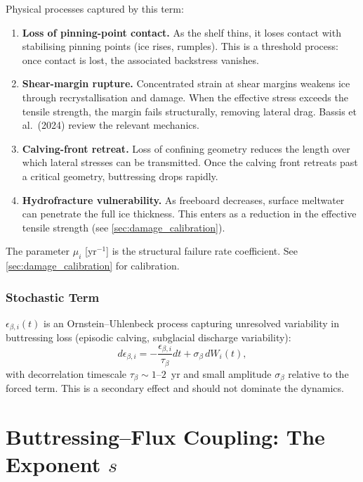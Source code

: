 \documentclass[11pt]{article}
\theoremstyle{definition}
\begin{document}
Physical processes captured by this term:
\begin{enumerate}
  \item \textbf{Loss of pinning-point contact.}  As the shelf thins, it loses contact with stabilising pinning points (ice rises, rumples).  This is a threshold process: once contact is lost, the associated backstress vanishes.
  \item \textbf{Shear-margin rupture.}  Concentrated strain at shear margins weakens ice through recrystallisation and damage.  When the effective stress exceeds the tensile strength, the margin fails structurally, removing lateral drag.  Bassis et al.\ (2024) review the relevant mechanics.
  \item \textbf{Calving-front retreat.}  Loss of confining geometry reduces the length over which lateral stresses can be transmitted.  Once the calving front retreats past a critical geometry, buttressing drops rapidly.
  \item \textbf{Hydrofracture vulnerability.}  As freeboard decreases, surface meltwater can penetrate the full ice thickness.  This enters as a reduction in the effective tensile strength (see \cref{sec:damage_calibration}).
\end{enumerate}

The parameter $\mu_i$ [yr$^{-1}$] is the structural failure rate coefficient.  See \cref{sec:damage_calibration} for calibration.

\subsubsection{Stochastic Term}

$\epsilon_{\beta,i}(t)$ is an Ornstein--Uhlenbeck process capturing unresolved variability in buttressing loss (episodic calving, subglacial discharge variability):
\begin{equation}
  d\epsilon_{\beta,i} = -\frac{\epsilon_{\beta,i}}{\tau_{\beta}} dt + \sigma_{\beta} \, dW_i(t),
\end{equation}
with decorrelation timescale $\tau_\beta \sim 1$--$2$~yr and small amplitude $\sigma_\beta$ relative to the forced term.  This is a secondary effect and should not dominate the dynamics.


\section{Buttressing--Flux Coupling: The Exponent $s$}
\label{sec:flux_exponent}
\end{document}
